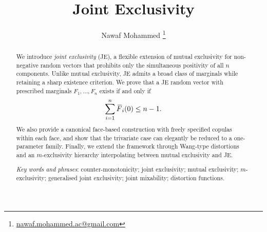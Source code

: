 \documentclass[letterpaper,12pt]{article}
\numberwithin{equation}{section}
\newcommand{\F}{\,\overline{\kern-0.175em F\kern-0em}}
\begin{document}
\doublespace
\title{\Large\textbf{{Joint Exclusivity}}}

\author[]{\small Nawaf Mohammed \thanks{\url{nawaf.mohammed.ac@gmail.com}}}

\affil[]{\footnotesize }
\date{}
\maketitle
\vspace{-1cm}
\begin{abstract}
We introduce \emph{joint exclusivity} (JE), a flexible extension of mutual exclusivity for non-negative random vectors that prohibits only the simultaneous positivity of all $n$ components. Unlike mutual exclusivity, JE admits a broad class of marginals while retaining a sharp existence criterion. We prove that a JE random vector with prescribed marginals $F_1,\ldots,F_n$ exists if and only if
\[
\sum_{i=1}^n \F_i(0)\le n-1.
\]
We also provide a canonical face-based construction with freely specified copulas within each face, and show that the trivariate case can elegantly be reduced to a one-parameter family. Finally, we extend the framework through Wang-type distortions and an $m$-exclusivity hierarchy interpolating between mutual exclusivity and JE.


\vspace{5cm}
\noindent\textit{Key words and phrases}: counter-monotonicity; joint exclusivity; mutual exclusivity; $m$-exclusivity; generalised joint exclusivity; joint mixability; distortion functions.
\end{abstract}
\end{document}
